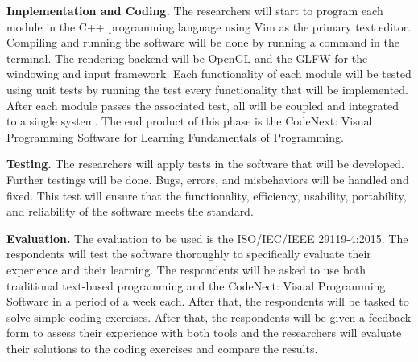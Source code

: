 \flushleft
\textbf{Implementation and Coding.}
\justifying
\parx
The researchers will start to program each module in the C++ programming
language using Vim as the primary text editor. Compiling and running the
software will be done by running a command in the terminal. The rendering
backend will be OpenGL and the GLFW for the windowing and input framework. Each
functionality of each module will be tested using unit tests by running the
test every functionality that will be implemented.  After each module passes
the associated test, all will be coupled and integrated to a single system. The
end product of this phase is the CodeNext: Visual Programming Software for
Learning Fundamentals of Programming.

\flushleft
\textbf{Testing.}
\justifying
\parx
The researchers will apply tests in the software that will be developed.
Further testings will be done. Bugs, errors, and misbehaviors will be handled
and fixed. This test will ensure that the functionality, efficiency,
usability, portability, and reliability of the software meets the standard.

\flushleft
\textbf{Evaluation.}
\justifying
\parx
The evaluation to be used is the ISO/IEC/IEEE 29119-4:2015. The respondents
will test the software thoroughly to specifically evaluate their experience and
their learning.
The respondents will be asked to use both traditional text-based programming and the
CodeNect: Visual Programming Software in a period of a week each. After that, the
respondents will be tasked to solve simple coding exercises. After that, the
respondents will be given a feedback form to assess their experience with both
tools and the researchers will evaluate their solutions to the coding exercises
and compare the results.
